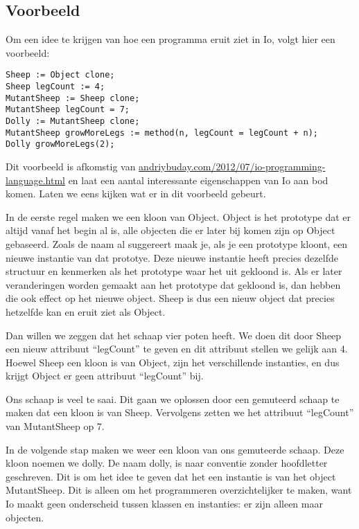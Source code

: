 \documentclass[12pt]{article}
\begin{document}
\subsection*{Voorbeeld}
Om een idee te krijgen van hoe een programma eruit ziet in Io, volgt hier een voorbeeld:
\begin{lstlisting}[frame=single]
Sheep := Object clone;
Sheep legCount := 4;
MutantSheep := Sheep clone;
MutantSheep legCount = 7;
Dolly := MutantSheep clone;
MutantSheep growMoreLegs := method(n, legCount = legCount + n);
Dolly growMoreLegs(2);
\end{lstlisting}
Dit voorbeeld is afkomstig van \url{andriybuday.com/2012/07/io-programming-language.html} en laat een aantal interessante eigenschappen van Io aan bod komen. Laten we eens kijken wat er in dit voorbeeld gebeurt.

In de eerste regel maken we een kloon van Object. Object is het prototype dat er altijd vanaf het begin al is,
alle objecten die er later bij komen zijn op Object gebaseerd.
Zoals de naam al suggereert maak je, als je een prototype kloont, een nieuwe instantie van dat prototye.
Deze nieuwe instantie heeft precies dezelfde structuur en kenmerken als het prototype waar het uit gekloond is.
Als er later veranderingen worden gemaakt aan het prototype dat gekloond is, dan hebben die ook effect op het nieuwe object.
Sheep is dus een nieuw object dat precies hetzelfde kan en eruit ziet als Object.\newline

Dan willen we zeggen dat het schaap vier poten heeft.
We doen dit door Sheep een nieuw attribuut ``legCount'' te geven en dit attribuut stellen we gelijk aan 4.
Hoewel Sheep een kloon is van Object, zijn het verschillende instanties, en dus krijgt Object er geen attribuut ``legCount'' bij.\newline

Ons schaap is veel te saai. Dit gaan we oplossen door een gemuteerd schaap te maken dat een kloon is van Sheep. Vervolgens zetten we het attribuut ``legCount'' van MutantSheep op 7.\newline

In de volgende stap maken we weer een kloon van ons gemuteerde schaap. Deze kloon noemen we dolly. De naam dolly, is naar conventie zonder hoofdletter geschreven.
Dit is om het idee te geven dat het een instantie is van het object MutantSheep.
Dit is alleen om het programmeren overzichtelijker te maken, want Io maakt geen onderscheid tussen klassen en instanties: er zijn alleen maar objecten.\newline
\end{document}
